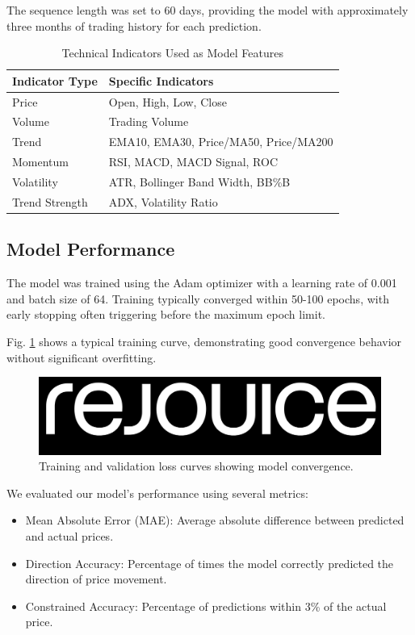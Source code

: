 \documentclass[conference]{IEEEtran}
\begin{document}
The sequence length was set to 60 days, providing the model with approximately three months of trading history for each prediction.

\begin{table}[h]
\caption{Technical Indicators Used as Model Features}
\centering
\begin{tabular}{ll}
\toprule
\textbf{Indicator Type} & \textbf{Specific Indicators} \\
\midrule
Price & Open, High, Low, Close \\
Volume & Trading Volume \\
Trend & EMA10, EMA30, Price/MA50, Price/MA200 \\
Momentum & RSI, MACD, MACD Signal, ROC \\
Volatility & ATR, Bollinger Band Width, BB\%B \\
Trend Strength & ADX, Volatility Ratio \\
\bottomrule
\end{tabular}
\label{tab:indicators}
\end{table}

\subsection{Model Performance}
The model was trained using the Adam optimizer with a learning rate of 0.001 and batch size of 64. Training typically converged within 50-100 epochs, with early stopping often triggering before the maximum epoch limit.

Fig. \ref{fig:training_curve} shows a typical training curve, demonstrating good convergence behavior without significant overfitting.

\begin{figure}[h]
\centering
\includegraphics[width=0.9\linewidth]{training_curve.png}
\caption{Training and validation loss curves showing model convergence.}
\label{fig:training_curve}
\end{figure}

We evaluated our model's performance using several metrics:

\begin{itemize}
\item Mean Absolute Error (MAE): Average absolute difference between predicted and actual prices.
\item Direction Accuracy: Percentage of times the model correctly predicted the direction of price movement.
\item Constrained Accuracy: Percentage of predictions within 3\% of the actual price.
\end{itemize}
\end{document}
